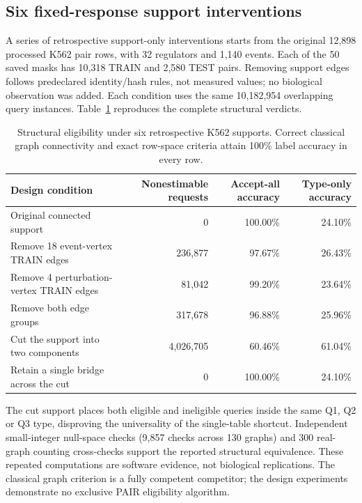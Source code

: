 \subsection{Six fixed-response support interventions}
A series of retrospective support-only interventions starts from the original 12,898 processed K562 pair rows, with 32 regulators and 1,140 events. Each of the 50 saved masks has 10,318 TRAIN and 2,580 TEST pairs. Removing support edges follows predeclared identity/hash rules, not measured values; no biological observation was added. Each condition uses the same 10,182,954 overlapping query instances. Table~\ref{tab:graph-stress-s} reproduces the complete structural verdicts.
\begin{table}[htbp]
\centering\small
\caption{Structural eligibility under six retrospective K562 supports. Correct classical graph connectivity and exact row-space criteria attain 100\% label accuracy in every row.}
\label{tab:graph-stress-s}
\begin{tabularx}{\textwidth}{@{}Xrrr@{}}
\toprule Design condition & Nonestimable requests & Accept-all accuracy & Type-only accuracy\\\midrule
Original connected support & 0 & 100.00\% & 24.10\%\\
Remove 18 event-vertex TRAIN edges & 236,877 & 97.67\% & 26.43\%\\
Remove 4 perturbation-vertex TRAIN edges & 81,042 & 99.20\% & 23.64\%\\
Remove both edge groups & 317,678 & 96.88\% & 25.96\%\\
Cut the support into two components & 4,026,705 & 60.46\% & 61.04\%\\
Retain a single bridge across the cut & 0 & 100.00\% & 24.10\%\\\bottomrule
\end{tabularx}
\end{table}
The cut support places both eligible and ineligible queries inside the same Q1, Q2 or Q3 type, disproving the universality of the single-table shortcut. Independent small-integer null-space checks (9,857 checks across 130 graphs) and 300 real-graph counting cross-checks support the reported structural equivalence. These repeated computations are software evidence, not biological replications. The classical graph criterion is a fully competent competitor; the design experiments demonstrate no exclusive PAIR eligibility algorithm.

